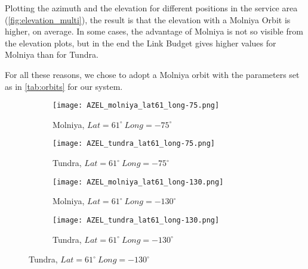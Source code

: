 Plotting the azimuth and the elevation for different positions in the service area (\autoref{fig:elevation_multi}), the result is that the elevation with a Molniya Orbit is higher, on average. In some cases, the advantage of Molniya is not so visible from the elevation plots, but in the end the Link Budget gives higher values for Molniya than for Tundra.

For all these reasons, we chose to adopt a Molniya orbit with the parameters set as in \autoref{tab:orbits} for our system.

\begin{figure}[!htbp]
	\begin{subfigure}{.5\textwidth}
	\centering
	\texttt{[image: AZEL\_molniya\_lat61\_long-75.png]}
	\caption{Molniya, $Lat = 61^\circ ~ Long = -75^\circ$}
	\end{subfigure}
	\begin{subfigure}{.5\textwidth}
	\centering
	\texttt{[image: AZEL\_tundra\_lat61\_long-75.png]}
	\caption{Tundra, $Lat = 61^\circ ~ Long = -75^\circ$}
	\end{subfigure}
	\vspace{0.5cm}
	\begin{subfigure}{.5\textwidth}
	\centering
	\texttt{[image: AZEL\_molniya\_lat61\_long-130.png]}
	\caption{Molniya, $Lat = 61^\circ ~ Long = -130^\circ$}
	\end{subfigure}
	\begin{subfigure}{.5\textwidth}
	\centering
	\texttt{[image: AZEL\_tundra\_lat61\_long-130.png]}
	\caption{Tundra, $Lat = 61^\circ ~ Long = -130^\circ$}
	\end{subfigure}
	\end{figure}
